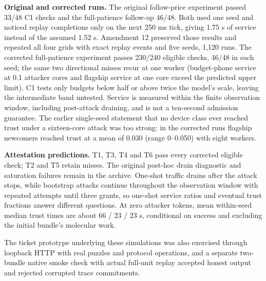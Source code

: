 \documentclass[11pt]{article}
\begin{document}
\textbf{Original and corrected runs.} The original follow-price experiment passed 33/48 C1 checks and the full-patience follow-up 46/48. Both used one seed and noticed replay completions only on the next 250 ms tick, giving 1.75 s of service instead of the assumed 1.52 s. Amendment 12 preserved those results and repeated all four grids with exact replay events and five seeds, 1,120 runs. The corrected full-patience experiment passes 230/240 eligible checks, 46/48 in each seed; the same two directional misses recur at one worker (budget-phone service at 0.1 attacker cores and flagship service at one core exceed the predicted upper limit). C1 tests only budgets below half or above twice the model's scale, leaving the intermediate band untested. Service is measured within the finite observation window, including post-attack draining, and is not a ten-second admission guarantee. The earlier single-seed statement that no device class ever reached trust under a sixteen-core attack was too strong: in the corrected runs flagship newcomers reached trust at a mean of 0.030 (range 0--0.050) with eight workers.

\textbf{Attestation predictions.} T1, T3, T4 and T6 pass every corrected eligible check; T2 and T5 retain misses. The original post-hoc drain diagnostic and saturation failures remain in the archive. One-shot traffic drains after the attack stops, while bootstrap attacks continue throughout the observation window with repeated attempts until three grants, so one-shot service ratios and eventual trust fractions answer different questions. At zero attacker tokens, mean within-seed median trust times are about 66 / 23 / 23 s, conditional on success and excluding the initial bundle's molecular work.

The ticket prototype underlying these simulations was also exercised through loopback HTTP with real puzzles and protocol operations, and a separate two-bundle native smoke check with actual full-unit replay accepted honest output and rejected corrupted trace commitments.
\end{document}
